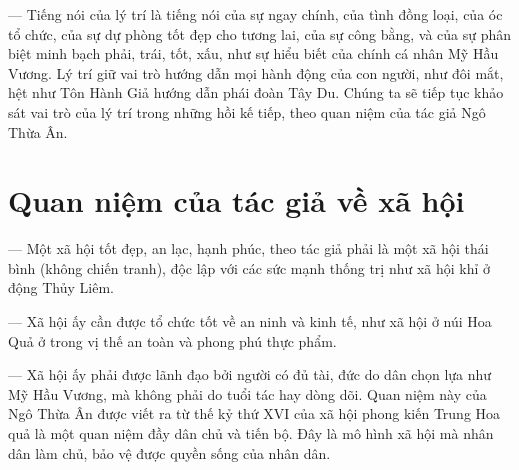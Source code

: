— Tiếng nói của lý trí là tiếng nói của sự ngay chính, của tình đồng loại, của óc tổ chức, của sự dự phòng tốt đẹp cho tương lai, của sự công bằng, và của sự phân biệt minh bạch phải, trái, tốt, xấu, như sự hiểu biết của chính cá nhân Mỹ Hầu Vương. Lý trí giữ vai trò hướng dẫn mọi hành động của con người, như đôi mắt, hệt như Tôn Hành Giả hướng dẫn phái đoàn Tây Du. Chúng ta sẽ tiếp tục khảo sát vai trò của lý trí trong những hồi kế tiếp, theo quan niệm của tác giả Ngô Thừa Ân.


\section{Quan niệm của tác giả về xã hội} %
\label{sec:1_quan_ve_xa_hoi}

— Một xã hội tốt đẹp, an lạc, hạnh phúc, theo tác giả phải là một xã hội thái bình (không chiến tranh), độc lập với các sức mạnh thống trị như xã hội khỉ ở động Thủy Liêm.

— Xã hội ấy cần được tổ chức tốt về an ninh và kinh tế, như xã hội ở núi Hoa Quả ở trong vị thế an toàn và phong phú thực phẩm.

— Xã hội ấy phải được lãnh đạo bởi người có đủ tài, đức do dân chọn lựa như Mỹ Hầu Vương, mà không phải do tuổi tác hay dòng dõi. Quan niệm này của Ngô Thừa Ân được viết ra từ thế kỷ thứ XVI của xã hội phong kiến Trung Hoa quả là một quan niệm đầy dân chủ và tiến bộ. Đây là mô hình xã hội mà nhân dân làm chủ, bảo vệ được quyền sống của nhân dân.
